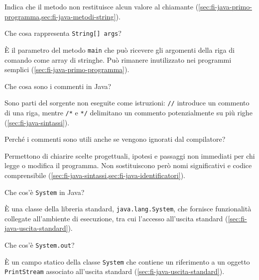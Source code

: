 Indica che il metodo non restituisce alcun valore al chiamante
(\cref{sec:fi-java-primo-programma,sec:fi-java-metodi-string}).

\begin{exercise}
\label{ex:fi-esercizi-introduzione-java-args}
Che cosa rappresenta \texttt{String[] args}?
\end{exercise}

È il parametro del metodo \texttt{main} che può ricevere gli argomenti della riga
di comando come array di stringhe. Può rimanere inutilizzato nei programmi
semplici (\cref{sec:fi-java-primo-programma}).

\begin{exercise}
\label{ex:fi-esercizi-introduzione-java-commenti}
Che cosa sono i commenti in Java?
\end{exercise}

Sono parti del sorgente non eseguite come istruzioni: \texttt{//} introduce un
commento di una riga, mentre \lstinline|/*| e \lstinline|*/| delimitano un
commento potenzialmente su più righe (\cref{sec:fi-java-sintassi}).

\begin{exercise}
\label{ex:fi-esercizi-introduzione-java-commenti-utilita}
Perché i commenti sono utili anche se vengono ignorati dal compilatore?
\end{exercise}

Permettono di chiarire scelte progettuali, ipotesi e passaggi non immediati per
chi legge o modifica il programma. Non sostituiscono però nomi significativi e
codice comprensibile (\cref{sec:fi-java-sintassi,sec:fi-java-identificatori}).

\begin{exercise}
\label{ex:fi-esercizi-introduzione-java-system}
Che cos'è \texttt{System} in Java?
\end{exercise}

È una classe della libreria standard, \texttt{java.lang.System}, che fornisce
funzionalità collegate all'ambiente di esecuzione, tra cui l'accesso all'uscita
standard (\cref{sec:fi-java-uscita-standard}).

\begin{exercise}
\label{ex:fi-esercizi-introduzione-java-system-out}
Che cos'è \texttt{System.out}?
\end{exercise}

È un campo statico della classe \texttt{System} che contiene un riferimento a un
oggetto \texttt{PrintStream} associato all'uscita standard
(\cref{sec:fi-java-uscita-standard}).

